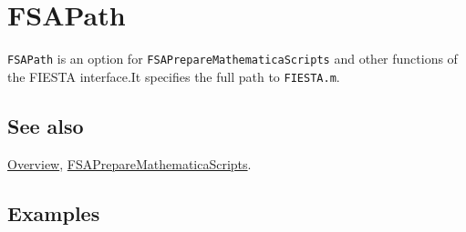 \documentclass[../FeynHelpersManual.tex]{subfiles}
\begin{document}
\hypertarget{fsapath}{
\section{FSAPath}\label{fsapath}}

\texttt{FSAPath} is an option for \texttt{FSAPrepareMathematicaScripts}
and other functions of the FIESTA interface.It specifies the full path
to \texttt{FIESTA.m}.

\subsection{See also}

\hyperlink{toc}{Overview},
\hyperlink{fsapreparemathematicascripts}{FSAPrepareMathematicaScripts}.

\subsection{Examples}
\end{document}
